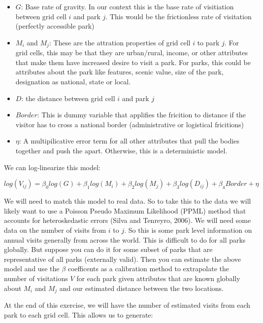 \documentclass[
  letterpaper,
  DIV=11,
  numbers=noendperiod]{scrartcl}
\providecommand{\tightlist}{%
  \setlength{\itemsep}{0pt}\setlength{\parskip}{0pt}}\usepackage{longtable,booktabs,array}
\begin{document}
\begin{itemize}
\tightlist
\item
  \(G\): Base rate of gravity. In our context this is the base rate of
  visitiation between grid cell \(i\) and park \(j\). This would be the
  frictionless rate of visitation (perfectly accessible park)
\item
  \(M_i\) and \(M_j\): These are the attration properties of grid cell
  \(i\) to park \(j\). For grid cells, this may be that they are
  urban/rural, income, or other attributes that make them have increased
  desire to visit a park. For parks, this could be attributes about the
  park like features, scenic value, size of the park, designation as
  national, state or local.
\item
  \(D\): the distance between grid cell \(i\) and park \(j\)
\item
  \(Border\): This is dummy variable that applifies the fricition to
  distance if the visitor has to cross a national border (administrative
  or logistical fricitions)
\item
  \(\eta\): A multipilicative error term for all other attributes that
  pull the bodies together and push the apart. Otherwise, this is a
  deterministic model.
\end{itemize}

We can log-linearize this model:

\[
log(V_{ij}) = \beta_0 log(G) + \beta_1 log(M_i) + \beta_2 log(M_j) + \beta_3 log(D_{ij}) + \beta_4 Border + \eta
\]

We will need to match this model to real data. So to take this to the
data we will likely want to use a Poisson Pseudo Maximum Likelihood
(PPML) method that accounts for heteroskedastic errors (Silva and
Tenreyro, 2006). We will need some data on the number of visits from
\(i\) to \(j\). So this is some park level information on annual visits
generally from across the world. This is difficult to do for all parks
globally. But suppose you can do it for some subset of parks that are
representative of all parks (externally valid). Then you can estimate
the above model and use the \(\beta\) coefficents as a calibration
method to extrapolate the number of visitations \(V\) for each park
given attributes that are known globally about \(M_i\) and \(M_j\) and
our estimated distance between the two locations.

At the end of this exercise, we will have the number of estimated visits
from each park to each grid cell. This allows us to generate:
\end{document}
